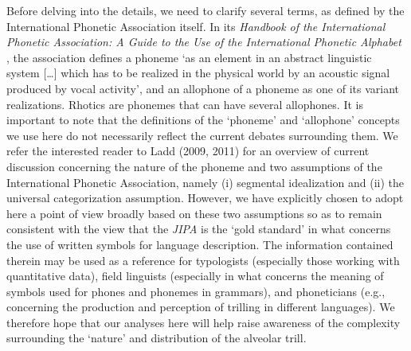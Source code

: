 Before delving into the details, we need to clarify several terms, as defined by the International Phonetic Association itself. In its \textit{Handbook of the International Phonetic Association: A Guide to the Use of the International Phonetic Alphabet} \parencite[27]{ipaHandbookInternationalPhonetic1999}, the association defines a phoneme ‘as an element in an abstract linguistic system […] which has to be realized in the physical world by an acoustic signal produced by vocal activity’, and an allophone of a phoneme as one of its variant realizations. Rhotics are phonemes that can have several allophones. It is important to note that the definitions of the ‘phoneme’ and ‘allophone’ concepts we use here do not necessarily reflect the current debates surrounding them. We refer the interested reader to Ladd (2009, 2011) for an overview of current discussion concerning the nature of the phoneme and two assumptions of the International Phonetic Association, namely (i) segmental idealization and (ii) the universal categorization assumption. However, we have explicitly chosen to adopt here a point of view broadly based on these two assumptions so as to remain consistent with the view that the \textit{JIPA} is the ‘gold standard’ in what concerns the use of written symbols for language description. The information contained therein may be used as a reference for typologists (especially those working with quantitative data), field linguists (especially in what concerns the meaning of symbols used for phones and phonemes in grammars), and phoneticians (e.g., concerning the production and perception of trilling in different languages). We therefore hope that our analyses here will help raise awareness of the complexity surrounding the ‘nature’ and distribution of the alveolar trill.\\

